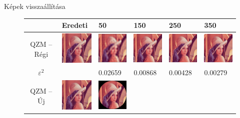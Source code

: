 \documentclass{beamer}
\begin{document}
\begin{frame}{Képek visszaállítása}
    \begin{adjustwidth}{-1.5em}{0em}
    \bigskip
    \begin{footnotesize}
    \begin{figure}
        \centering
    \begin{tabular}{c | q q q q q }
     & Eredeti & 50 & 150 & 250 & 350 \\ \hline\hline
    QZM -- Régi & 
    \includegraphics[width=50pt]{figures/reconstruction/lo256.png} &
    \includegraphics[width=50pt]{figures/reconstruction/lo25650.png} &
    \includegraphics[width=50pt]{figures/reconstruction/lo256150.png} &
    \includegraphics[width=50pt]{figures/reconstruction/lo256250.png} &
    \includegraphics[width=50pt]{figures/reconstruction/lo256350.png} \\
    $\varepsilon^2$ & & 0.02659 & 0.00868 & 0.00428 & 0.00279 \\
    QZM -- Új& 
    \includegraphics[width=50pt]{figures/reconstruction/lo256.png} &
    \includegraphics[width=50pt]{figures/reconstruction/ln25650.png} &

\end{tabular}
\end{figure}
\end{footnotesize}
\end{adjustwidth}
\end{frame}
\end{document}
